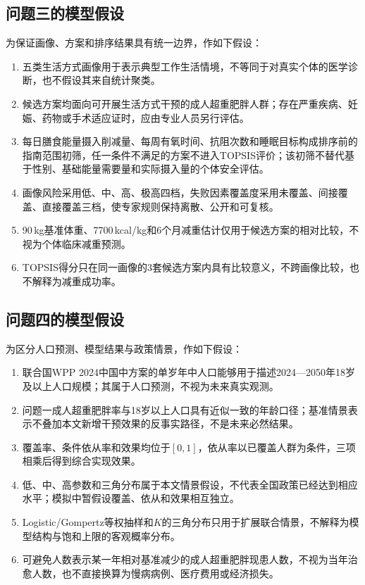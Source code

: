 \subsection{问题三的模型假设}

为保证画像、方案和排序结果具有统一边界，作如下假设：

\begin{enumerate}[label=(\arabic*),leftmargin=2em]
  \item 五类生活方式画像用于表示典型工作生活情境，不等同于对真实个体的医学诊断，也不假设其来自统计聚类。
  \item 候选方案均面向可开展生活方式干预的成人超重肥胖人群；存在严重疾病、妊娠、药物或手术适应证时，应由专业人员另行评估。
  \item 每日膳食能量摄入削减量、每周有氧时间、抗阻次数和睡眠目标构成排序前的指南范围初筛，任一条件不满足的方案不进入TOPSIS评价；该初筛不替代基于性别、基础能量需要量和实际摄入量的个体安全评估。
  \item 画像风险采用低、中、高、极高四档，失败因素覆盖度采用未覆盖、间接覆盖、直接覆盖三档，使专家规则保持离散、公开和可复核。
  \item 90\,kg基准体重、7700\,kcal/kg和6个月减重估计仅用于候选方案的相对比较，不视为个体临床减重预测。
  \item TOPSIS得分只在同一画像的3套候选方案内具有比较意义，不跨画像比较，也不解释为减重成功率。
\end{enumerate}

\subsection{问题四的模型假设}

为区分人口预测、模型结果与政策情景，作如下假设：

\begin{enumerate}[label=(\arabic*),leftmargin=2em]
  \item 联合国WPP 2024中国中方案的单岁年中人口能够用于描述2024---2050年18岁及以上人口规模；其属于人口预测，不视为未来真实观测。
  \item 问题一成人超重肥胖率与18岁以上人口具有近似一致的年龄口径；基准情景表示不叠加本文新增干预效果的反事实路径，不是未来必然结果。
  \item 覆盖率、条件依从率和效果均位于$[0,1]$，依从率以已覆盖人群为条件，三项相乘后得到综合实现效果。
  \item 低、中、高参数和三角分布属于本文情景假设，不代表全国政策已经达到相应水平；模拟中暂假设覆盖、依从和效果相互独立。
  \item Logistic/Gompertz等权抽样和$K$的三角分布只用于扩展联合情景，不解释为模型结构与饱和上限的客观概率分布。
  \item 可避免人数表示某一年相对基准减少的成人超重肥胖现患人数，不视为当年治愈人数，也不直接换算为慢病病例、医疗费用或经济损失。
\end{enumerate}

